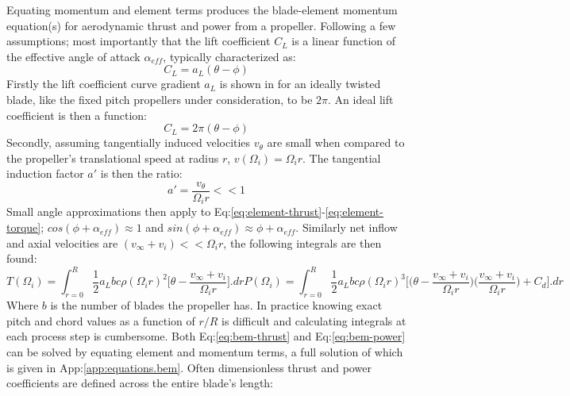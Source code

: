 Equating momentum and element terms produces the blade-element momentum equation(s) for aerodynamic thrust and power from a propeller. Following a few assumptions; most importantly that the lift coefficient $C_L$ is a linear function of the effective angle of attack $\alpha_{eff}$, typically characterized as:
\begin{equation}
C_L=a_L(\theta-\phi)
\end{equation}
Firstly the lift coefficient curve gradient $a_L$ is shown in \cite{aerodynamicsforengineering} for an ideally twisted blade, like the fixed pitch propellers under consideration, to be $2\pi$. An ideal lift coefficient is then a function:
\begin{equation}\label{eq:lift-curve-gradient}
C_L=2\pi(\theta-\phi)
\end{equation}
Secondly, assuming tangentially induced velocities $v_\theta$ are small when compared to the propeller's translational speed at radius $r$, $v(\Omega_i)=\Omega_i r$. The tangential induction factor $a'$ is then the ratio:
\begin{equation}
a'=\frac{v_\theta}{\Omega_i r}<<1
\end{equation}
Small angle approximations then apply to Eq:\ref{eq:element-thrust}-\ref{eq:element-torque}; $cos(\phi+\alpha_{eff})\approx 1$ and $sin(\phi+\alpha_{eff})\approx \phi+\alpha_{eff}$. Similarly net inflow and axial velocities are $(v_\infty + v_i)<<\Omega_i r$, the following integrals are then found:
\begin{subequations}
\begin{equation}\label{eq:bem-thrust}
T(\Omega_i)=\int_{r=0}^R \frac{1}{2} a_L b c \rho (\Omega_i r)^2 \bigg[\theta-\frac{v_\infty+v_i}{\Omega_i r}\bigg].dr
\end{equation}
\begin{equation}\label{eq:bem-power}
P(\Omega_i)=\int_{r=0}^R \frac{1}{2}a_L b c \rho (\Omega_i r)^3\bigg[\big(\theta-\frac{v_\infty+v_i}{\Omega_i r}\big)\big(\frac{v_\infty+v_i}{\Omega_i r}\big) + C_d\bigg].dr
\end{equation}
\end{subequations}
Where $b$ is the number of blades the propeller has. In practice knowing exact pitch and chord values as a function of $r/R$ is difficult and calculating integrals at each process step is cumbersome. Both Eq:\ref{eq:bem-thrust} and Eq:\ref{eq:bem-power} can be solved by equating element and momentum terms, a full solution of which is given in App:\ref{app:equations.bem}. Often dimensionless thrust and power coefficients are defined across the entire blade's length:
